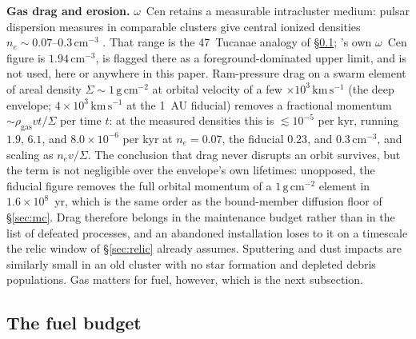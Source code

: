 \documentclass[11pt]{article}
\newcommand{\ocen}{\ensuremath{\omega}~Cen}
\begin{document}
\textbf{Gas drag and erosion.} \ocen{} retains a measurable intracluster medium: pulsar dispersion measures in comparable clusters give central ionized densities $n_{e} \sim 0.07$--$0.3\,\mathrm{cm^{-3}}$ \citep{Freire2001,Abbate2018}. That range is the 47~Tucanae analogy of \S\ref{sec:fuel}; \citet{oMEGACatVII2025}'s own \ocen{} figure is $1.94\,\mathrm{cm^{-3}}$, is flagged there as a foreground-dominated upper limit, and is not used, here or anywhere in this paper. Ram-pressure drag on a swarm element of areal density $\Sigma \sim 1\,\mathrm{g\,cm^{-2}}$ at orbital velocity of a few $\times10^{3}\,\mathrm{km\,s^{-1}}$ (the deep envelope; $4\times10^{3}\,\mathrm{km\,s^{-1}}$ at the 1~AU fiducial) removes a fractional momentum $\sim \rho_{\mathrm{gas}} v t / \Sigma$ per time $t$: at the measured densities this is $\lesssim 10^{-5}$ per kyr, running $1.9$, $6.1$, and $8.0 \times 10^{-6}$ per kyr at $n_{e} = 0.07$, the fiducial $0.23$, and $0.3\,\mathrm{cm^{-3}}$, and scaling as $n_{e}v/\Sigma$. The conclusion that drag never disrupts an orbit survives, but the term is not negligible over the envelope's own lifetimes: unopposed, the fiducial figure removes the full orbital momentum of a $1\,\mathrm{g\,cm^{-2}}$ element in $1.6\times10^{8}$~yr, which is the same order as the bound-member diffusion floor of \S\ref{sec:mc}. Drag therefore belongs in the maintenance budget rather than in the list of defeated processes, and an abandoned installation loses to it on a timescale the relic window of \S\ref{sec:relic} already assumes. Sputtering and dust impacts are similarly small in an old cluster with no star formation and depleted debris populations. Gas matters for fuel, however, which is the next subsection.

\subsection{The fuel budget}
\label{sec:fuel}
\end{document}
